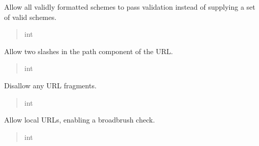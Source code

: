 \documentclass[letterpaper,10pt,english]{sphinxmanual}
\begin{document}
\begin{fulllineitems}
\begin{fulllineitems}
\pysigstartsignatures
{}
\pysigstopsignatures
\sphinxAtStartPar
Allow all validly formatted schemes to pass validation
instead of supplying a set of valid schemes.
\begin{quote}\begin{description}
\sphinxAtStartPar
int

\end{description}\end{quote}

\end{fulllineitems}



\begin{fulllineitems}

\pysigstartsignatures
{}
\pysigstopsignatures
\sphinxAtStartPar
Allow two slashes in the path component of the URL.
\begin{quote}\begin{description}
\sphinxAtStartPar
int

\end{description}\end{quote}

\end{fulllineitems}



\begin{fulllineitems}

\pysigstartsignatures
{}
\pysigstopsignatures
\sphinxAtStartPar
Disallow any URL fragments.
\begin{quote}\begin{description}
\sphinxAtStartPar
int

\end{description}\end{quote}

\end{fulllineitems}



\begin{fulllineitems}

\pysigstartsignatures
{}
\pysigstopsignatures
\sphinxAtStartPar
Allow local URLs, enabling a broad\sphinxhyphen{}brush check.
\begin{quote}\begin{description}
\sphinxAtStartPar
int


\end{description}
\end{quote}
\end{fulllineitems}
\end{fulllineitems}
\end{document}
